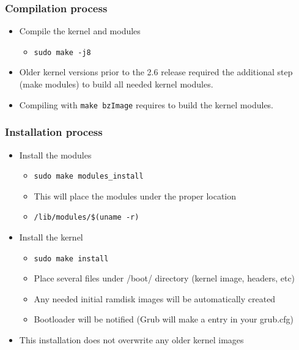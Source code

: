 \documentclass{beamer}
\begin{document}

\begin{frame}
\frametitle{Compilation process}
 
\begin{itemize}
   \item Compile the kernel and modules
      \begin{itemize}
      \item \texttt{sudo make -j8}
      \end{itemize}
   \item Older kernel versions prior to the 2.6 release required the additional step (make modules) to build all needed kernel modules.
   \item Compiling with \texttt{make bzImage} requires to build the kernel modules.
\end{itemize}

\end{frame}


\begin{frame}
\frametitle{Installation process}
 
\begin{itemize}

    \item Install the modules
      \begin{itemize}
      \item \texttt{sudo make modules\_install}
      \item This will place the modules under the proper location
      \item \texttt{/lib/modules/\$(uname -r)}
      \end{itemize}

  \item Install the kernel
      \begin{itemize}
      \item \texttt{sudo make install}
      \item Place several files under /boot/ directory (kernel image, headers, etc)
      \item Any needed initial ramdisk images will be automatically created
      \item Bootloader will be notified (Grub will make a entry in your grub.cfg)
      \end{itemize}
   \item This installation does not overwrite any older kernel images

\end{itemize}

\end{frame}
\end{document}
